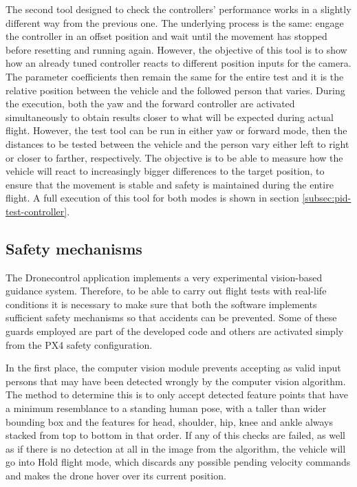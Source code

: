 The second tool designed to check the controllers' performance works in a slightly different way from the previous one.
The underlying process is the same: engage the controller in an offset position and wait until the movement has stopped before resetting and running again.
However, the objective of this tool is to show how an already tuned controller reacts to different position inputs for the camera.
The parameter coefficients then remain the same for the entire test and it is the relative position between the vehicle and the followed person that varies.
During the execution, both the yaw and the forward controller are activated simultaneously to obtain results closer to what will be expected during actual flight.
However, the test tool can be run in either yaw or forward mode, then the distances to be tested between the vehicle and the person vary either left to right or closer to farther, respectively.
The objective is to be able to measure how the vehicle will react to increasingly bigger differences to the target position, to ensure that the movement is stable and safety is maintained during the entire flight.
A full execution of this tool for both modes is shown in section \ref{subsec:pid-test-controller}.


\subsection{Safety mechanisms}
\label{subsec:safety}

The Dronecontrol application implements a very experimental vision-based guidance system.
Therefore, to be able to carry out flight tests with real-life conditions it is necessary to make sure that both the software implements sufficient safety mechanisms so that accidents can be prevented.
Some of these guards employed are part of the developed code and others are activated simply from the PX4 safety configuration.

In the first place, the computer vision module prevents accepting as valid input persons that may have been detected wrongly by the computer vision algorithm.
The method to determine this is to only accept detected feature points that have a minimum resemblance to a standing human pose, with a taller than wider bounding box and the features for head, shoulder, hip, knee and ankle always stacked from top to bottom in that order.
If any of this checks are failed, as well as if there is no detection at all in the image from the algorithm, the vehicle will go into Hold flight mode, which discards any possible pending velocity commands and makes the drone hover over its current position.

